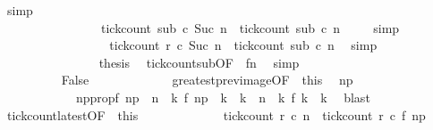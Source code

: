 \begin{isabellebody}
\ simp\isanewline
\ \ \ \ \ \ \ \ \ \ \ \ \ \ \isamarkupfalse%
\ \isamarkupfalse%
\isanewline
\ \ \ \ \ \ \ \ \ \ \ \ \ \ \ \ {\isacartoucheopen}tick{\isacharunderscore}count\ sub\ c\ {\isacharparenleft}Suc\ n\ {\isasymle}\ tick{\isacharunderscore}count\ sub\ c\ n\ \isamarkupfalse%
\ {}\ \isamarkupfalse%
\ simp\isanewline
\ \ \ \ \ \ \ \ \ \ \ \ \ \ \isamarkupfalse%
\ \isamarkupfalse%
\ {\isacartoucheopen}tick{\isacharunderscore}count\ r\ c\ {\isacharparenleft}Suc\ n{\isacharparenright}\ {\isasymle}\ tick{\isacharunderscore}count\ sub\ c\ n\ \isamarkupfalse%
\ simp\isanewline
\ \ \ \ \ \ \ \ \ \ \ \ \ \ \isamarkupfalse%
\ {\isacharquery}thesis\ \isamarkupfalse%
\ tick{\isacharunderscore}count{\isacharunderscore}sub{\isacharbrackleft}OF\ {\isacharasterisk}{\isacharbrackright}\ fn\ \isamarkupfalse%
\ simp\isanewline
\ \ \ \ \ \ \ \ \ \ \isamarkupfalse%
\isanewline
\ \ \ \ \ \ \isamarkupfalse%
\isanewline
\ \ \ \ \ \ \ \ \isamarkupfalse%
\ False\ %
\isanewline
\ \ \ \ \ \ \ \ \ \ \isamarkupfalse%
\ greatest{\isacharunderscore}prev{\isacharunderscore}image{\isacharbrackleft}OF\ {\isacharasterisk}\ this{\isacharbrackright}\ \isamarkupfalse%
\ n\isactrlsub p\ \ \isanewline
\ \ \ \ \ \ \ \ \ \ \ \ np{\isacharunderscore}prop{\isacharcolon}{\isacartoucheopen}f\ n\isactrlsub p\ {\isacharless}\ n\ {\isasymand}\ {\isacharparenleft}{\isasymforall}k{\isachardot}\ f\ n\isactrlsub p\ {\isacharless}\ k\ {\isasymand}\ k\ {\isasymle}\ n\ {\isasymlongrightarrow}\ {\isacharparenleft}{\isasymnexists}k\ f\ k\ {\isacharequal}\ k{\isacharparenright}{\isacharparenright}{\isacartoucheclose}\ \isamarkupfalse%
\ blast\isanewline
\ \ \ \ \ \ \ \ \ \ \isamarkupfalse%
\ tick{\isacharunderscore}count{\isacharunderscore}latest{\isacharbrackleft}OF\ {\isacharasterisk}\ this{\isacharbrackright}\ \isamarkupfalse%
\isanewline
\ \ \ \ \ \ \ \ \ \ \ \ {\isacartoucheopen}tick{\isacharunderscore}count\ r\ c\ n\ {\isacharequal}\ tick{\isacharunderscore}count\ r\ c\ {\isacharparenleft}f\ n\isactrlsub p{\isacharparenright}{\isacartoucheclose}\ \isacommand{{\isachardot}}\isamarkupfalse%

\end{isabellebody}
